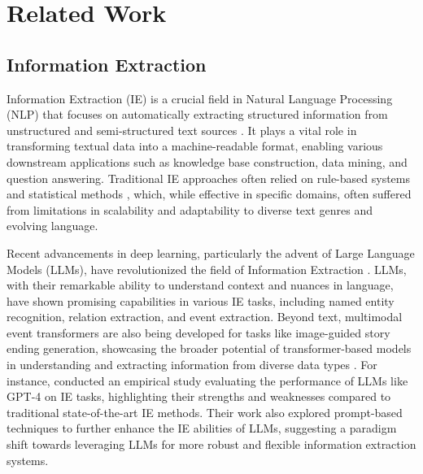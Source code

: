 \section{Related Work}
\subsection{Information Extraction}

Information Extraction (IE) is a crucial field in Natural Language Processing (NLP) that focuses on automatically extracting structured information from unstructured and semi-structured text sources \cite{CITE-IE-BOOK-NOW}. It plays a vital role in transforming textual data into a machine-readable format, enabling various downstream applications such as knowledge base construction, data mining, and question answering. Traditional IE approaches often relied on rule-based systems and statistical methods \cite{CITE-IE-RESEARCHGATE}, which, while effective in specific domains, often suffered from limitations in scalability and adaptability to diverse text genres and evolving language.

Recent advancements in deep learning, particularly the advent of Large Language Models (LLMs), have revolutionized the field of Information Extraction \cite{CITE-IE-EMPIRICAL-LLM}. LLMs, with their remarkable ability to understand context and nuances in language, have shown promising capabilities in various IE tasks, including named entity recognition, relation extraction, and event extraction.  Beyond text, multimodal event transformers are also being developed for tasks like image-guided story ending generation, showcasing the broader potential of transformer-based models in understanding and extracting information from diverse data types \cite{zhou2023multimodal}. For instance, \cite{CITE-IE-EMPIRICAL-LLM} conducted an empirical study evaluating the performance of LLMs like GPT-4 on IE tasks, highlighting their strengths and weaknesses compared to traditional state-of-the-art IE methods. Their work also explored prompt-based techniques to further enhance the IE abilities of LLMs, suggesting a paradigm shift towards leveraging LLMs for more robust and flexible information extraction systems.

